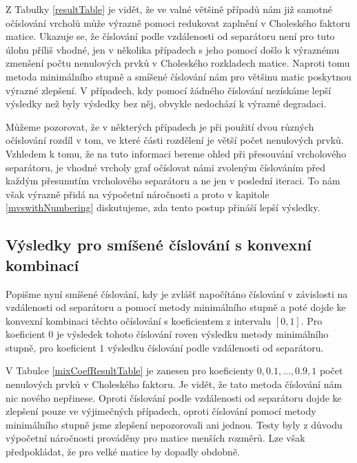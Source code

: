 \documentclass[11pt,american,czech,oneside]{book}
\theoremstyle{plain}
\theoremstyle{definition}
\begin{document}
Z Tabulky \ref{resultTable} je vidět, že ve valné většině případů nám již samotné očíslování vrcholů může výrazně pomoci redukovat zaplnění v Choleského faktoru matice. Ukazuje se, že číslování podle vzdálenosti od separátoru není pro tuto úlohu příliš vhodné, jen v několika případech s jeho pomocí došlo k výraznému zmenšení počtu nenulových prvků v Choleského rozkladech matice. Naproti tomu metoda minimálního stupně a smíšené číslování nám pro většinu matic poskytnou výrazné zlepšení. V případech, kdy pomocí žádného číslování nezískáme lepší výsledky než byly výsledky bez něj, obvykle nedochází k výrazné degradaci.

Můžeme pozorovat, že v některých případech je při použití dvou různých očíslování rozdíl v tom, ve které části rozdělení je větší počet nenulových prvků. Vzhledem k tomu, že na tuto informaci bereme ohled při přesouvání vrcholového separátoru, je vhodné vrcholy graf očíslovat námi zvoleným číslováním před každým přesunutím vrcholového separátoru a ne jen v poslední iteraci. To nám však výrazně přidá na výpočetní náročnosti a proto v kapitole \ref{mvswithNumbering} diskutujeme, zda tento postup přináší lepší výsledky.

\subsection{Výsledky pro smíšené číslování s konvexní kombinací}

Popišme nyní smíšené číslování, kdy je zvlášť napočítáno číslování v závislosti na vzdálenosti od separátoru a pomocí metody minimálního stupně a poté dojde ke konvexní kombinaci těchto očíslování s koeficientem z intervalu $[0,1]$. Pro koeficient $0$ je výsledek tohoto číslování roven výsledku metody minimálního stupně, pro koeficient $1$ výsledku číslování podle vzdálenosti od separátoru.

V Tabulce \ref{mixCoefResultTable} je zanesen pro koeficienty $0, 0.1,\ldots,0.9, 1$ počet nenulových prvků v Choleského faktoru. Je vidět, že tato metoda číslování nám nic nového nepřinese. Oproti číslování podle vzdálenosti od separátoru dojde ke zlepšení pouze ve výjimečných případech, oproti číslování pomocí metody minimálního stupně jsme zlepšení nepozorovali ani jednou. Testy byly z důvodu výpočetní náročnosti prováděny pro matice menších rozměrů. Lze však předpokládat, že pro velké matice by dopadly obdobně.
\end{document}
